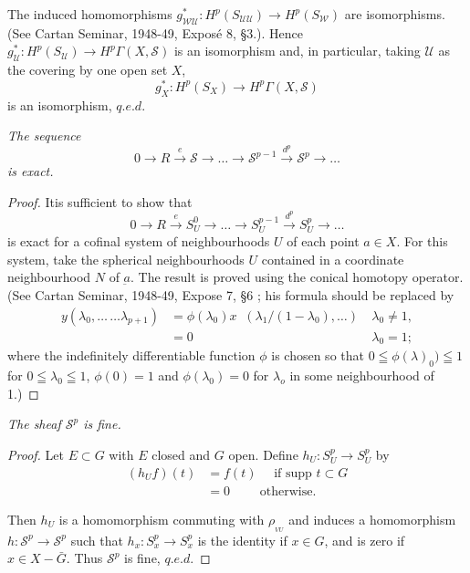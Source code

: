 The induced homomorphisms $ g^\ast_{\mathscr{W} \mathscr{U}} : H^p (
S_{\mathscr{U} \mathscr{U}} ) \rightarrow H^p ( S_{\mathscr{W}}) $ are
isomorphisms. (See Cartan Seminar, 1948-49, Expos\'e 8, \S 3.).
 Hence  $g^\ast_{\mathscr{U}} : H^p ( S_{\mathscr{U}} ) \rightarrow
H^p \Gamma ( X, \mathscr{S} ) $ is an isomorphism and, in particular,
taking $ \mathscr{U} $ as the covering by one open set $X$, 
$$
g^\ast_X : H^p (S_X ) \rightarrow  H^p \Gamma ( X, \mathscr{S} )  
$$
is an isomorphism, $q.e.d$.

\textit{The sequence}
$$
0 \rightarrow R \xrightarrow{e} \mathscr{S}  \rightarrow  \dots
\rightarrow  \mathscr{S}^{p-1} \xrightarrow{d^p} \mathscr{S}^p
\rightarrow \dots  
$$
\textit{is exact.}

\begin{proof}
It\pageoriginale is  sufficient to show that  
$$
0 \rightarrow R  \xrightarrow{e} S^0_U \rightarrow \dots \rightarrow
S^{p-1}_U \xrightarrow{d^p} S^p_U \rightarrow \dots  
$$
is exact for a cofinal system of neighbourhoods $U$ of each point $ a
\in X $. For this system, take the spherical neighbourhoods $U$
contained in a coordinate neighbourhood $N$ of $ \underbar{a} $. The
result is proved using the conical homotopy operator. (See Cartan
Seminar, 1948-49, Expose 7, \S 6 ; his formula should be
replaced by  
\begin{align*}
y ( \lambda_0 , \ldots \, \ldots \lambda_{p+1} ) &= \phi ( \lambda_0 )
x \; \; ( \lambda_1 / ( 1 -\lambda_0 ) , \ldots ) ~ &\lambda_0 \neq 1, \\  
&=  0  &\lambda_0 = 1 ; 
\end{align*}
where the indefinitely differentiable function $\phi$ is chosen so
that $0 \leqq \phi ( \lambda)_0 ) \leqq 1$ for $0 \leqq \lambda_0
\leqq 1$, $\phi (0) = 1$ and $\phi ( \lambda_0 ) = 0$ for $\lambda_o $
in some neighbourhood of 1.)  
\end{proof}

\textit{The sheaf  $ \mathscr{S}^p $  is fine.} 

\begin{proof}
Let $E \subset G$  with $E$ closed and $G$ open. Define $ h_U :
S^p_U \rightarrow S^p_U$ by 
\begin{align*}
( h_U  f )  (t) &=  f (t) \quad \text{ if  supp } t \subset G \\ 
&= 0  \qquad \text{ otherwise.}
\end{align*}

Then $h_U$ is a homomorphism commuting with $\rho_{_{VU}}$ and induces a
homomorphism $h : \mathscr{S}^p \rightarrow \mathscr{S}^p$ such that
$h_x : S^p_x \rightarrow S^p_x$ is the  identity if $x \in G$, and
is zero if $x \in X - \bar{G}$. Thus $\mathscr{S}^p$ is fine, $q.e.d$.  
\end{proof}

